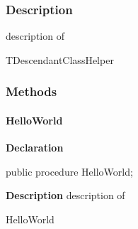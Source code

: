 \documentclass{report}
\begin{document}
\subsubsection*{\large{\textbf{Description}}\normalsize\hspace{1ex}\hfill}
description of \begin{ttfamily}TDescendantClassHelper\end{ttfamily}\subsubsection*{\large{\textbf{Methods}}\normalsize\hspace{1ex}\hfill}
\paragraph*{HelloWorld}\hspace*{\fill}

\begin{list}{}{
\setlength{\itemindent}{0cm}
\setlength{\listparindent}{0cm}
\setlength{\leftmargin}{\evensidemargin}
\addtolength{\leftmargin}{\tmplength}
\settowidth{\labelsep}{X}
\addtolength{\leftmargin}{\labelsep}
\setlength{\labelwidth}{\tmplength}
}
\begin{flushleft}
\item[\textbf{Declaration}\hfill]
\begin{ttfamily}
public procedure HelloWorld;\end{ttfamily}


\end{flushleft}
\par
\item[\textbf{Description}]
description of \begin{ttfamily}HelloWorld\end{ttfamily}

\end{list}
\end{document}
